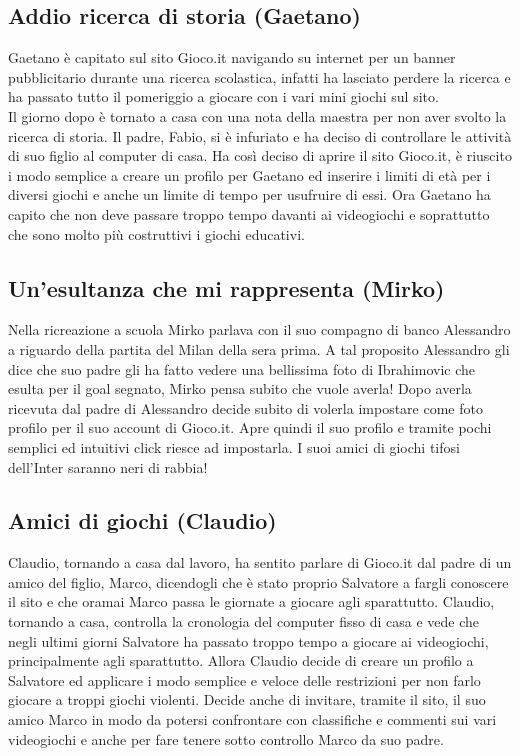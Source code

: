 \documentclass[../Report.tex]{subfiles}
\begin{document}
    \subsection{Addio ricerca di storia (Gaetano)}
    Gaetano è capitato sul sito Gioco.it navigando su internet per un banner pubblicitario durante una ricerca scolastica, infatti ha lasciato perdere la ricerca e ha passato tutto il pomeriggio a giocare con i vari mini giochi sul sito.\\
    Il giorno dopo è tornato a casa con una nota della maestra per non aver svolto la ricerca di storia. Il padre, Fabio, si è infuriato e ha deciso di controllare le attività di suo figlio al computer di casa. Ha così deciso di aprire il sito Gioco.it, è riuscito i modo semplice a creare un profilo per Gaetano ed inserire i limiti di età per i diversi giochi e anche un limite di tempo per usufruire di essi. Ora Gaetano ha capito che non deve passare troppo tempo davanti ai videogiochi e soprattutto che sono molto più costruttivi i giochi educativi.

    \subsection{Un'esultanza che mi rappresenta (Mirko)}
    Nella ricreazione a scuola Mirko parlava con il suo compagno di banco Alessandro a riguardo della partita del Milan della sera prima. A tal proposito Alessandro gli dice che suo padre gli ha fatto vedere una bellissima foto di Ibrahimovic che esulta per il goal segnato, Mirko pensa subito che vuole averla! Dopo averla ricevuta dal padre di Alessandro decide subito di volerla impostare come foto profilo per il suo account di Gioco.it. Apre quindi il suo profilo e tramite pochi semplici ed intuitivi click riesce ad impostarla. I suoi amici di giochi tifosi dell'Inter saranno neri di rabbia!

    \subsection{Amici di giochi (Claudio)}
    Claudio, tornando a casa dal lavoro, ha sentito parlare di Gioco.it dal padre di un amico del figlio, Marco, dicendogli che è stato proprio Salvatore a fargli conoscere il sito e che oramai Marco passa le giornate a giocare agli sparattutto. Claudio, tornando a casa, controlla la cronologia del computer fisso di casa e vede che negli ultimi giorni Salvatore ha passato troppo tempo a giocare ai videogiochi, principalmente agli sparattutto. Allora Claudio decide di creare un profilo a Salvatore ed applicare i modo semplice e veloce delle restrizioni per non farlo giocare a troppi giochi violenti. Decide anche di invitare, tramite il sito, il suo amico Marco in modo da potersi confrontare con classifiche e commenti sui vari videogiochi e anche per fare tenere sotto controllo Marco da suo padre.
\end{document}
